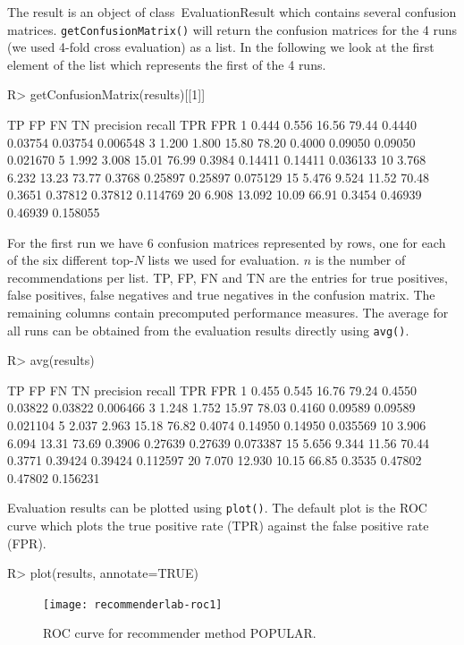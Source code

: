 \documentclass[nojss]{jss}
\newcommand{\class}[1]{\mbox{\textsf{#1}}}
\newcommand{\func}[1]{\mbox{\texttt{#1()}}}
\begin{document}
The result is an object of class~\class{EvaluationResult} which
contains several confusion matrices. \func{getConfusionMatrix} 
will return the confusion matrices for the 4 runs 
(we used 4-fold cross evaluation) as a list.
In the following we look at the first element of the list which
represents the first of the 4 runs.


\begin{Schunk}
\begin{Sinput}
R> getConfusionMatrix(results)[[1]]
\end{Sinput}
\begin{Soutput}
      TP     FP    FN    TN precision  recall     TPR      FPR
1  0.444  0.556 16.56 79.44    0.4440 0.03754 0.03754 0.006548
3  1.200  1.800 15.80 78.20    0.4000 0.09050 0.09050 0.021670
5  1.992  3.008 15.01 76.99    0.3984 0.14411 0.14411 0.036133
10 3.768  6.232 13.23 73.77    0.3768 0.25897 0.25897 0.075129
15 5.476  9.524 11.52 70.48    0.3651 0.37812 0.37812 0.114769
20 6.908 13.092 10.09 66.91    0.3454 0.46939 0.46939 0.158055
\end{Soutput}
\end{Schunk}

For the first run we have 6 confusion matrices represented by rows, one for each
of the six different top-$N$ lists we used for evaluation.
$n$ is the number of recommendations per list. TP, FP, FN and TN are the
entries for
true positives, false positives, false negatives and true negatives in 
the confusion matrix. The remaining columns contain precomputed performance 
measures. The average for all runs can be obtained 
from the evaluation results directly using \func{avg}.

\begin{Schunk}
\begin{Sinput}
R> avg(results)
\end{Sinput}
\begin{Soutput}
      TP     FP    FN    TN precision  recall     TPR      FPR
1  0.455  0.545 16.76 79.24    0.4550 0.03822 0.03822 0.006466
3  1.248  1.752 15.97 78.03    0.4160 0.09589 0.09589 0.021104
5  2.037  2.963 15.18 76.82    0.4074 0.14950 0.14950 0.035569
10 3.906  6.094 13.31 73.69    0.3906 0.27639 0.27639 0.073387
15 5.656  9.344 11.56 70.44    0.3771 0.39424 0.39424 0.112597
20 7.070 12.930 10.15 66.85    0.3535 0.47802 0.47802 0.156231
\end{Soutput}
\end{Schunk}

Evaluation results can be plotted using \func{plot}. The default
plot is the ROC curve which plots the true positive rate (TPR) against the 
false positive rate (FPR). 
\begin{Schunk}
\begin{Sinput}
R> plot(results, annotate=TRUE)
\end{Sinput}
\end{Schunk}
\begin{figure}
\centerline{\texttt{[image: recommenderlab-roc1]}}
\caption{ROC curve for recommender method POPULAR.}
\label{fig:roc1}
\end{figure}
\end{document}
